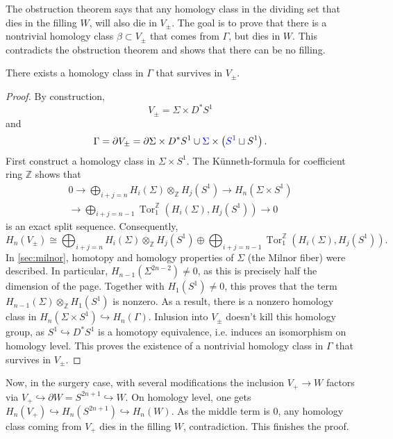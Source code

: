 The obstruction theorem says that any homology class in the dividing set that dies in the filling $W$, will also
die in $V_{\pm}$.
The goal is to prove that there is a nontrivial homology class $\beta \subset V_\pm$ that
comes from $\Gamma$, but dies in $W$. This contradicts the obstruction theorem and shows that there can be no filling.

\begin{lemma}
    There exists a homology class in $\Gamma$ that survives in $V_\pm$.
\end{lemma}
\begin{proof}
    By construction,
    \[
        V_\pm = \Sigma \times D^*S^1
    \]
    and
    \[
        \Gamma = \partial V_\pm = \partial \Sigma \times D^*S^1 \cup \textcolor{blue}{\Sigma} \times \left(\textcolor{blue}{S^1} \sqcup S^1\right).
    \]
    First construct a homology class in $\Sigma \times S^1$.
    The Künneth-formula for coefficient ring $\mathbb Z$ shows that
    \begin{multline}
        0 \to \bigoplus_{i+j = n} H_i(\Sigma) \otimes_{\mathbb Z} H_j(S^1) \to  H_n(\Sigma \times S^1)\\
        \to \bigoplus_{i+j = n-1} \operatorname{Tor}^\mathbb{Z}_1\left(H_i(\Sigma), H_j(S^1)\right) \to 0
    \end{multline}
    is an exact split sequence.
    Consequently,
    \[
        H_n(V_\pm) \cong \bigoplus_{i+j = n} H_i(\Sigma) \otimes_{\mathbb Z} H_j(S^1) \oplus 
        \bigoplus_{i+j = n-1} \operatorname{Tor}^\mathbb{Z}_1\left(H_i(\Sigma), H_j(S^1)\right).
    \]
    In \cref{sec:milnor}, homotopy and homology properties of $\Sigma$ (the Milnor fiber) were described.
    In particular, $H_{n-1}(\Sigma^{2n-2}) \neq 0$, as this is precisely half the dimension of the page.
    Together with $H_1(S^1) \neq 0$, this proves that the term $H_{n-1}(\Sigma) \otimes_{\mathbb Z} H_1(S^1)$ is nonzero. As a result, 
    there is a nonzero homology class in $H_n(\Sigma \times S^1) \hookrightarrow H_n(\Gamma)$.
    Inlusion into $V_\pm$ doesn't kill this homology group, as $S^1 \hookrightarrow D^*S^1$ is a homotopy equivalence,
    i.e. induces an isomorphism on homology level. 
    This proves the existence of a nontrivial homology class in $\Gamma$ that survives in $V_\pm$.
\end{proof}

Now, in the surgery case, with several modifications the inclusion
$V_+ \to W$ factors via $V_+ \hookrightarrow \partial W = S^{2n+1} \hookrightarrow W$.
On homology level, one gets
$H_n(V_+) \hookrightarrow H_n(S^{2n+1}) \hookrightarrow H_n(W)$.
As the middle term is $0$, any homology class coming from $V_+$ dies in the filling $W$, contradiction.
This finishes the proof.